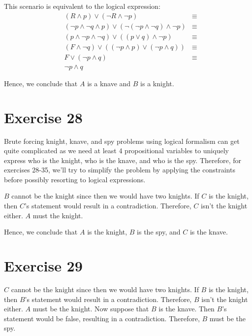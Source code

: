 \documentclass{article}
\begin{document}
This scenario is equivalent to the logical expression:
\begin{align*}
	 & (R \land p) \lor (\neg R \land \neg p)                                       & \equiv \\
	 & (\neg p \land \neg q \land p) \lor (\neg (\neg p \land \neg q) \land \neg p) & \equiv \\
	 & (p \land \neg p \land \neg q) \lor ((p \lor q) \land \neg p)                 & \equiv \\
	 & (F \land \neg q) \lor ((\neg p \land p) \lor (\neg p \land q))               & \equiv \\
	 & F \lor (\neg p \land q)                                                      & \equiv \\
	 & \neg p \land q
\end{align*}

Hence, we conclude that $A$ is a knave and $B$ is a knight.

\pagebreak

\section{Exercise 28}
Brute forcing knight, knave, and spy problems using logical formalism can get quite complicated as we need at least 4 propositional variables to uniquely express who is the knight, who is the knave, and who is the spy. Therefore, for exercises 28-35, we'll try to simplify the problem by applying the constraints before possibly resorting to logical expressions.

$B$ cannot be the knight since then we would have two knights.  If $C$ is the knight, then $C$'s statement would result in a contradiction.  Therefore, $C$ isn't the knight either. $A$ must the knight.

Hence, we conclude that $A$ is the knight, $B$ is the spy, and $C$ is the knave.

\pagebreak

\section{Exercise 29}
$C$ cannot be the knight since then we would have two knights.  If $B$ is the knight, then $B$'s statement would result in a contradiction. Therefore, $B$ isn't the knight either. $A$ must be the knight.
Now suppose that $B$ is the knave. Then $B$'s statement would be false, resulting in a contradiction. Therefore, $B$ must be the spy.
\end{document}
